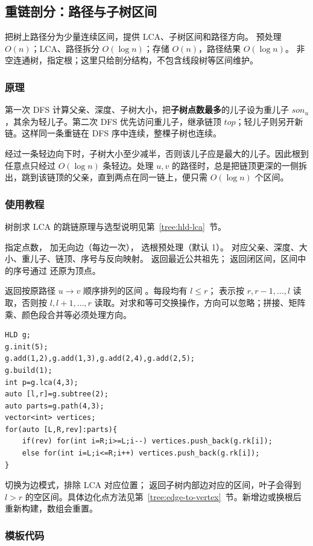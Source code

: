 \subsection{重链剖分：路径与子树区间}
\label{tree:hld}
\AlgorithmInfo
    {把树上路径分为少量连续区间，提供 LCA、子树区间和路径方向。}
    {预处理 $O(n)$；LCA、路径拆分 $O(\log n)$；存储 $O(n)$，路径结果 $O(\log n)$。}
    {非空连通树，指定根；这里只给剖分结构，不包含线段树等区间维护。}
\subsubsection*{原理}
第一次 DFS 计算父亲、深度、子树大小，把\textbf{子树点数最多}的儿子设为重儿子 $son_u$，其余为轻儿子。第二次 DFS 优先访问重儿子，继承链顶 $top$；轻儿子则另开新链。这样同一条重链在 DFS 序中连续，整棵子树也连续。

经过一条轻边向下时，子树大小至少减半，否则该儿子应是最大的儿子。因此根到任意点只经过 $O(\log n)$ 条轻边。处理 $u,v$ 的路径时，总是把链顶更深的一侧拆出，跳到该链顶的父亲，直到两点在同一链上，便只需 $O(\log n)$ 个区间。

\subsubsection*{使用教程}
树剖求 LCA 的跳链原理与选型说明见第~\ref{tree:hld-lca}~节。

 指定点数， 加无向边（每边一次）， 选根预处理（默认 1）。 对应父亲、深度、大小、重儿子、链顶、序号与反向映射。 返回最近公共祖先； 返回闭区间，区间中的序号通过  还原为顶点。

 返回按原路径 $u\to v$ 顺序排列的区间 。每段均有 $l\le r$； 表示按 $r,r-1,\ldots,l$ 读取，否则按 $l,l+1,\ldots,r$ 读取。对求和等可交换操作，方向可以忽略；拼接、矩阵乘、颜色段合并等必须处理方向。
\begin{lstlisting}[style=mtycpp,numbers=none]
HLD g;
g.init(5);
g.add(1,2),g.add(1,3),g.add(2,4),g.add(2,5);
g.build(1);
int p=g.lca(4,3);
auto [l,r]=g.subtree(2);
auto parts=g.path(4,3);
vector<int> vertices;
for(auto [L,R,rev]:parts){
	if(rev) for(int i=R;i>=L;i--) vertices.push_back(g.rk[i]);
	else for(int i=L;i<=R;i++) vertices.push_back(g.rk[i]);
}
\end{lstlisting}
 切换为边模式，排除 LCA 对应位置； 返回子树内部边对应的区间，叶子会得到 $l>r$ 的空区间。具体边化点方法见第~\ref{tree:edge-to-vertex}~节。新增边或换根后重新构建，数组会重置。
\subsubsection*{模板代码}
